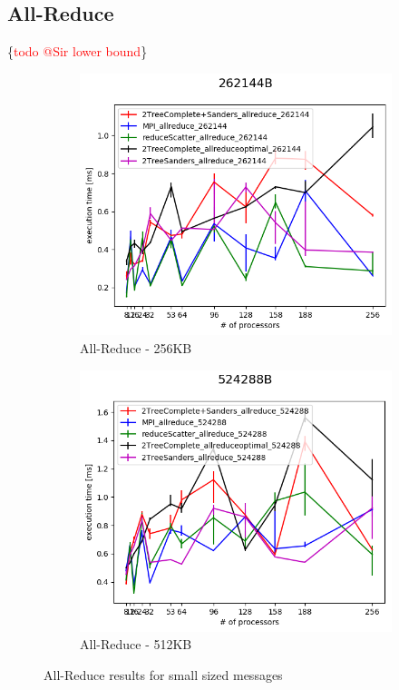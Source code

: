 \documentclass[sigplan,review,anonymous]{acmart}\settopmatter{printfolios=true,printccs=false,printacmref=false}
\begin{document}
\subsection{All-Reduce}
\ifcmts \{\textcolor{red}{todo @Sir lower bound}\}
\begin{figure}
\centering
\begin{subfigure}{.25\textwidth}
  \centering
  \includegraphics[width=1\linewidth]{images/Results/AllReduce/allreducecomp3_262144B.png}
  \caption{All-Reduce - 256KB}
  \label{reduce-selected-256B}
\end{subfigure}%
\begin{subfigure}{.25\textwidth}
  \centering
  \includegraphics[width=1\linewidth]{images/Results/AllReduce/allreducecomp3_524288B.png}
  \caption{All-Reduce - 512KB}
  \label{reduce-selected-512B}
\end{subfigure}
\caption{All-Reduce results for small sized messages}
\label{graph-reduce-small-selected}
\end{figure}
\end{document}
